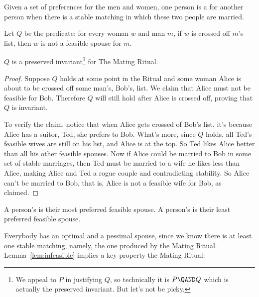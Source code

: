 \begin{definition}
Given a set of preferences for the men and women, one person is a
 for another person when there is a stable
matching in which these two people are married.
\end{definition}

\begin{definition}\label{infeasibleP}
Let $Q$ be the predicate: for every woman $w$ and man $m$, if
$w$ is crossed off $m$'s list, then $w$ is not a feasible spouse for $m$.
\end{definition}

\begin{lemma}\label{lem:infeasible}
  $Q$ is a preserved invariant\footnote{We appeal to $P$ in justifying
    $Q$, so technically it is $P \QAND Q$ which is actually the
    preserved invariant.  But let's not be picky.} for The Mating
  Ritual.

\end{lemma}

\begin{proof}
Suppose $Q$ holds at some point in the Ritual and some woman Alice
is about to be crossed off some man's, Bob's, list.  We claim that
Alice must not be feasible for Bob.  Therefore $Q$ will still hold
after Alice is crossed off, proving that $Q$ is invariant.

To verify the claim, notice that when Alice gets crossed of Bob's
list, it's because Alice has a suitor, Ted, she prefers to Bob.
What's more, since $Q$ holds, all Ted's feasible wives are still on
his list, and Alice is at the top.  So Ted likes Alice better than all
his other feasible spouses.  Now if Alice could be married to Bob in
some set of stable marriages, then Ted must be married to a wife he
likes less than Alice, making Alice and Ted a rogue couple and
contradicting stability.  So Alice can't be married to Bob, that is,
Alice is not a feasible wife for Bob, as claimed.
\end{proof}

\begin{definition}
A person's  is their most preferred feasible
spouse.  A person's  is their least preferred
feasible spouse.
\end{definition}

Everybody has an optimal and a pessimal spouse, since we know there is
at least one stable matching, namely, the one produced by the Mating
Ritual.  Lemma~\ref{lem:infeasible} implies a key property the Mating
Ritual:

